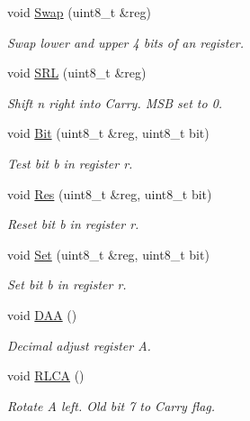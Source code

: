 \begin{DoxyCompactItemize}
void \mbox{\hyperlink{classCPU_abd96e68ea71dbec9b7e4f182d12af433}{Swap}} (uint8\+\_\+t \&reg)
\begin{DoxyCompactList}\small\item\em Swap lower and upper 4 bits of an register. \end{DoxyCompactList}\item 
void \mbox{\hyperlink{classCPU_a5e81b5dceebf45a9deb31fa0dbd0f667}{S\+RL}} (uint8\+\_\+t \&reg)
\begin{DoxyCompactList}\small\item\em Shift n right into Carry. M\+SB set to 0. \end{DoxyCompactList}\item 
void \mbox{\hyperlink{classCPU_ad260c5b0e5222059080f696f06b6085e}{Bit}} (uint8\+\_\+t \&reg, uint8\+\_\+t bit)
\begin{DoxyCompactList}\small\item\em Test bit b in register r. \end{DoxyCompactList}\item 
void \mbox{\hyperlink{classCPU_a4a15466d458acbff3c7e81241b64ca76}{Res}} (uint8\+\_\+t \&reg, uint8\+\_\+t bit)
\begin{DoxyCompactList}\small\item\em Reset bit b in register r. \end{DoxyCompactList}\item 
void \mbox{\hyperlink{classCPU_a65d2624fadb2b0d6e7921a45055139d9}{Set}} (uint8\+\_\+t \&reg, uint8\+\_\+t bit)
\begin{DoxyCompactList}\small\item\em Set bit b in register r. \end{DoxyCompactList}\item 
void \mbox{\hyperlink{classCPU_a6c5d437be85715df3f628163e4eabfd7}{D\+AA}} ()
\begin{DoxyCompactList}\small\item\em Decimal adjust register A. \end{DoxyCompactList}\item 
\mbox{\label{classCPU_aa873eda2df368ca1d40bad0e13fdbc1a}} 
void \mbox{\hyperlink{classCPU_aa873eda2df368ca1d40bad0e13fdbc1a}{R\+L\+CA}} ()
\begin{DoxyCompactList}\small\item\em Rotate A left. Old bit 7 to Carry flag. \end{DoxyCompactList}\item 

\end{DoxyCompactItemize}
